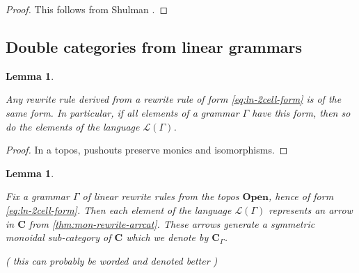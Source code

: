 \documentclass{amsart}
\newcommand{\C}{\cat{C}}
\newcommand{\LinArrCat}{\cat{C}}
\newcommand{\cat}[1]{\mathbf{#1}}
\newcommand{\OpenOb}{\mathbf{Open} }
\newcommand{\edit}[1]{\textcolor{editcolour}{(#1)}}
\newtheorem{lemma}[theorem]{Lemma}
\theoremstyle{remark}
\theoremstyle{definition}
\begin{document}
\begin{proof}
  
  This follows from Shulman \cite{shulman-constructing}.
  
\end{proof}


\subsection{Double categories from linear grammars}
\label{sec:dblcats-linr-gramrs}


\begin{lemma}
  \label{thm:der-rewr-rule-dbl-monic}

  Any rewrite rule derived from a rewrite rule of form
  \eqref{eq:ln-2cell-form} is of the same form. In particular, if all
  elements of a grammar \( \Gamma \) have this form, then so do the
  elements of the language \( \mathcal{L} (\Gamma) \).
  
\end{lemma}

\begin{proof}

  In a topos, pushouts preserve monics and isomorphisms.
  
\end{proof}

\begin{lemma}
  \label{thm:lr_open-objects-language}

  Fix a grammar $ \Gamma $ of linear rewrite rules from the topos
  $ \OpenOb $, hence of form \eqref{eq:ln-2cell-form}. Then each
  element of the language $ \mathcal{L}(\Gamma) $ represents an arrow
  in \( \C \) from \ref{thm:mon-rewrite-arrcat}. These arrows generate
  a symmetric monoidal sub-category of \( \LinArrCat \) which we denote by
  \( \LinArrCat_\Gamma \).

  \edit{ this can probably be worded and denoted better }
  
\end{lemma}
\end{document}

